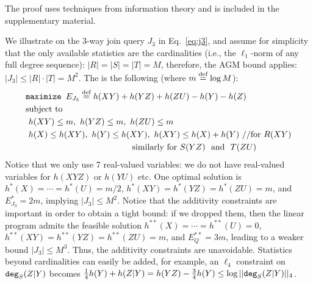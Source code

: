 The proof uses techniques from information theory and is included in the supplementary material. 

\begin{example}
  We illustrate \lptdb on the 3-way join query $J_3$ in
  Eq.~\eqref{eq:j3}, and assume for simplicity that the only available
  statistics are the cardinalities (i.e., the $\ell_1$-norm of any
  full degree sequence): $|R|=|S|=|T|=M$, therefore, the AGM bound
  applies: $|J_3|\leq |R|\cdot |T| = M^2$.  The \lptdb is the
  following (where $m \stackrel{\text{def}}{=} \log M$):
  \begin{align*}
    & \texttt{maximize } E_{J_3}\defeq h(XY)+h(YZ)+h(ZU)-h(Y)-h(Z)\\
    & \text{subject to} \\
    & \ h(XY) \leq m,\ h(YZ) \leq m,\ h(ZU) \leq m\\
    & \ h(X)\leq h(XY),\ h(Y)\leq h(XY),\ h(XY)\leq h(X)+h(Y)\ // \text{for } R(XY)\\
    & \hspace{44mm} \text{similarly for $S(YZ)$ \text{ and } $T(ZU)$}
  \end{align*}
  Notice that we only use 7 real-valued variables: we do not have
  real-valued variables for $h(XYZ)$ or $h(YU)$ etc.  One optimal
  solution is $h^*(X)=\cdots=h^*(U)=m/2$, $h^*(XY)=h^*(YZ)=h^*(ZU)=m$,
  and $E_{J_3}^*=2m$, implying $|J_3|\leq M^2$.  Notice that the
  additivity constraints are important in order to obtain a tight
  bound: if we dropped them, then the linear program admits the
  feasible solution $h^{**}(X)=\cdots=h^{**}(U)=0$,
  $h^{**}(XY)=h^{**}(YZ)=h^{**}(ZU)=m$, and $E_Q^{**}=3m$, leading to
  a weaker bound $|J_3|\leq M^3$.  Thus, the additivity constraints
  are unavoidable.  Statistics beyond cardinalities can easily be
  added, for example, an $\ell_4$ constraint on $\texttt{deg}_S(Z|Y)$
  becomes
  $\frac{1}{4}h(Y)+h(Z|Y) = h(YZ) - \frac{3}{4}h(Y) \leq \log
  ||\texttt{deg}_S(Z|Y)||_4$.
\end{example}

